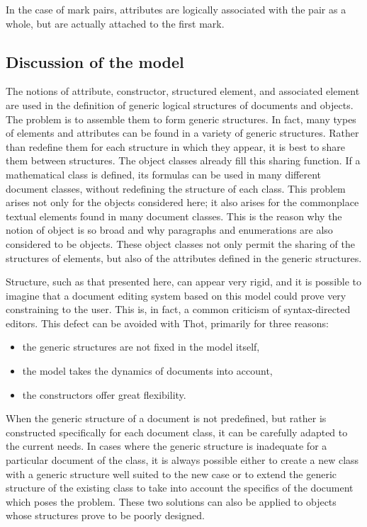 In the case of mark pairs, attributes are logically associated with
the pair as a whole, but are actually attached to the first mark.

\subsection{Discussion of the model}

The notions of attribute, constructor, structured element, and
associated element are used in the definition of generic logical
structures of documents and objects.  The problem is to assemble them
to form generic structures.  In fact, many types of elements and
attributes can be found in a variety of generic structures.  Rather
than redefine them for each structure in which they appear, it is best
to share them between structures. The object classes already fill this
sharing function.  If a mathematical class is defined, its formulas
can be used in many different document classes, without redefining the
structure of each class.  This problem arises not only for the objects
considered here; it also arises for the commonplace textual elements
found in many document classes.  This is the reason why the notion of
object is so broad and why paragraphs and enumerations are also
considered to be objects.  These object classes not only permit the
sharing of the structures of elements, but also of the attributes
defined in the generic structures.

Structure, such as that presented here, can appear very rigid, and it
is possible to imagine that a document editing system based on this
model could prove very constraining to the user.  This is, in fact, a
common criticism of syntax-directed editors.  This defect can be
avoided with Thot, primarily for three reasons:
\begin{itemize}
  \item the generic structures are not fixed in the model itself,
  \item the model takes the dynamics of documents into account,
  \item the constructors offer great flexibility.
\end{itemize}

When the generic structure of a document is not predefined, but rather
is constructed specifically for each document class, it can be
carefully adapted to the current needs.  In cases where the generic
structure is inadequate for a particular document of the class, it is
always possible either to create a new class with a generic structure
well suited to the new case or to extend the generic structure of the
existing class to take into account the specifics of the document
which poses the problem.  These two solutions can also be applied to
objects whose structures prove to be poorly designed.

